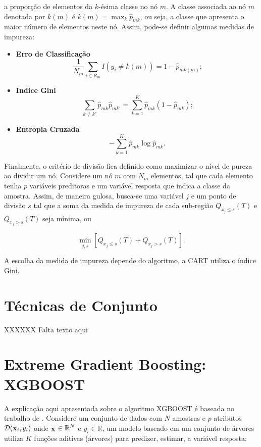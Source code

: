 a proporção de elementos da $k$-ésima classe no nó $m$. A classe associada ao nó $m$ denotada por $k(m)$ é $k(m)=\max_k\hat{p}_{mk}$, ou seja, a classe que apresenta o maior número de elementos neste nó. Assim, pode-se definir algumas medidas de impureza:

\begin{itemize}
\item {\bf Erro de Classificação}
\begin{equation}
\frac{1}{N_m}\sum_{i\in{R_m}}I(y_i\neq{k}(m))=1-\hat{p}_{mk(m)}\mbox{;}
\end{equation}
\item {\bf Indice Gini}
\begin{equation}
\sum_{k\neq{k}'}\hat{p}_{mk}\hat{p}_{mk'}=\sum_{k=1}^{K}\hat{p}_{mk}(1-\hat{p}_{mk})\mbox{;}
\end{equation}
\item {\bf Entropia Cruzada}
\begin{equation}
-\sum_{k=1}^K\hat{p}_{mk}\log\hat{p}_{mk}\mbox{.}
\end{equation}
\end{itemize}

Finalmente, o critério de divisão fica definido como maximizar o nível de pureza ao dividir um nó. Considere um nó $m$ com $N_m$ elementos, tal que cada elemento tenha $p$ variáveis preditoras e um variável resposta que indica a classe da amostra. Assim, de maneira gulosa, busca-se uma variável $j$ e um ponto de divisão $s$ tal que a soma da medida de impureza de cada sub-região $Q_{x_j\le{s}}(T)$ e $Q_{x_j>{s}}(T)$ seja mínima, ou

\begin{equation}
\min_{j,s}\left[Q_{x_j\le{s}}(T)+Q_{x_j>{s}}(T)\right]\mbox{.}
\end{equation}

A escolha da medida de impureza depende do algoritmo, a CART utiliza o índice Gini.

\section{Técnicas de Conjunto}

XXXXXX Falta texto aqui

\section{Extreme Gradient Boosting: XGBOOST}

A explicação aqui apresentada sobre o algoritmo XGBOOST é baseada no trabalho de \cite{CHEN:2016}. Considere um conjunto de dados com $N$ amostras e $p$ atributos $\mathcal{D}({\bf x}_i, y_i)$ onde $_{\bf X}\in\mathbb{R}^N$ e $y_i\in\mathbb{R}$, um modelo baseado em um conjunto de árvores utiliza $K$ funções aditivas (árvores) para predizer, estimar, a variável resposta:


